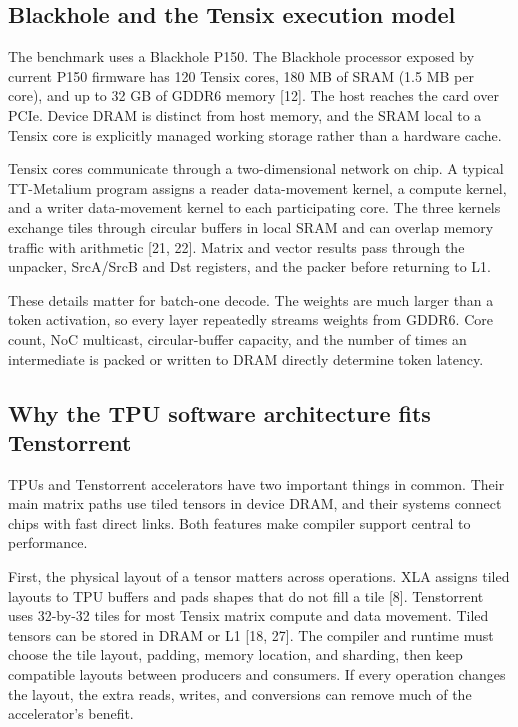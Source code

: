 \documentclass[
  10pt,
  american,
  10pt,
  letterpaper]{article}
\begin{document}
\hypertarget{blackhole-and-the-tensix-execution-model}{%
\subsection{Blackhole and the Tensix execution
model}\label{blackhole-and-the-tensix-execution-model}}

The benchmark uses a Blackhole P150. The Blackhole processor exposed by
current P150 firmware has 120 Tensix cores, 180 MB of SRAM (1.5 MB per
core), and up to 32 GB of GDDR6 memory {[}12{]}. The host reaches the
card over PCIe. Device DRAM is distinct from host memory, and the SRAM
local to a Tensix core is explicitly managed working storage rather than
a hardware cache.

Tensix cores communicate through a two-dimensional network on chip. A
typical TT-Metalium program assigns a reader data-movement kernel, a
compute kernel, and a writer data-movement kernel to each participating
core. The three kernels exchange tiles through circular buffers in local
SRAM and can overlap memory traffic with arithmetic {[}21, 22{]}. Matrix
and vector results pass through the unpacker, SrcA/SrcB and Dst
registers, and the packer before returning to L1.

These details matter for batch-one decode. The weights are much larger
than a token activation, so every layer repeatedly streams weights from
GDDR6. Core count, NoC multicast, circular-buffer capacity, and the
number of times an intermediate is packed or written to DRAM directly
determine token latency.

\hypertarget{why-the-tpu-software-architecture-fits-tenstorrent}{%
\subsection{Why the TPU software architecture fits
Tenstorrent}\label{why-the-tpu-software-architecture-fits-tenstorrent}}

TPUs and Tenstorrent accelerators have two important things in common.
Their main matrix paths use tiled tensors in device DRAM, and their
systems connect chips with fast direct links. Both features make
compiler support central to performance.

First, the physical layout of a tensor matters across operations. XLA
assigns tiled layouts to TPU buffers and pads shapes that do not fill a
tile {[}8{]}. Tenstorrent uses 32-by-32 tiles for most Tensix matrix
compute and data movement. Tiled tensors can be stored in DRAM or L1
{[}18, 27{]}. The compiler and runtime must choose the tile layout,
padding, memory location, and sharding, then keep compatible layouts
between producers and consumers. If every operation changes the layout,
the extra reads, writes, and conversions can remove much of the
accelerator's benefit.
\end{document}
